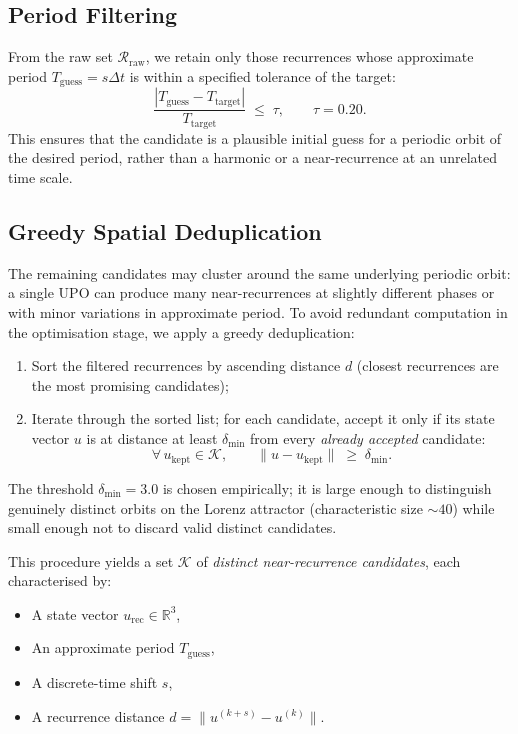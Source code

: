\documentclass[11pt,a4paper]{article}
\begin{document}
\subsection{Period Filtering}
From the raw set $\mathcal{R}_{\text{raw}}$, we retain only those
recurrences whose approximate period $T_{\text{guess}} = s\Delta t$ is within
a specified tolerance of the target:
\begin{equation}\label{eq:period_filter}
  \frac{|T_{\text{guess}} - T_{\text{target}}|}{T_{\text{target}}}
  \;\le\; \tau,
  \qquad \tau = 0.20.
\end{equation}
This ensures that the candidate is a plausible initial guess for a periodic
orbit of the desired period, rather than a harmonic or a near-recurrence at
an unrelated time scale.

\subsection{Greedy Spatial Deduplication}
The remaining candidates may cluster around the same underlying periodic
orbit: a single UPO can produce many near-recurrences at slightly different
phases or with minor variations in approximate period.  To avoid redundant
computation in the optimisation stage, we apply a greedy deduplication:

\begin{enumerate}[label=(\roman*)]
  \item Sort the filtered recurrences by ascending distance $d$ (closest
        recurrences are the most promising candidates);
  \item Iterate through the sorted list; for each candidate, accept it only
        if its state vector $u$ is at distance at least
        $\delta_{\min}$ from every \emph{already accepted} candidate:
        \begin{equation}\label{eq:dedup}
          \forall\,u_{\text{kept}} \in \mathcal{K},\qquad
          \|u - u_{\text{kept}}\| \;\ge\; \delta_{\min}.
        \end{equation}
\end{enumerate}
The threshold $\delta_{\min} = 3.0$ is chosen empirically; it is large enough
to distinguish genuinely distinct orbits on the Lorenz attractor
(characteristic size $\sim\!40$) while small enough not to discard valid
distinct candidates.

This procedure yields a set $\mathcal{K}$ of \emph{distinct near-recurrence
candidates}, each characterised by:
\begin{itemize}
  \item A state vector $u_{\text{rec}} \in \mathbb{R}^3$,
  \item An approximate period $T_{\text{guess}}$,
  \item A discrete-time shift $s$,
  \item A recurrence distance $d = \|u^{(k+s)} - u^{(k)}\|$.
\end{itemize}
\end{document}
